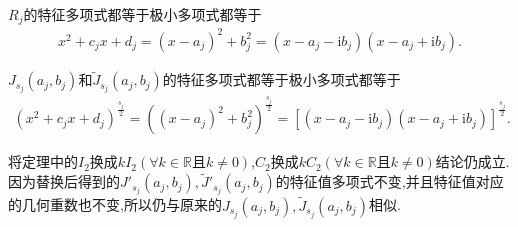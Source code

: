 \documentclass[../../main.tex]{subfiles}%
\begin{document}
\begin{theorem}[实数域上的广义Jordan标准型]
$R_j$的特征多项式都等于极小多项式都等于
\begin{align*}
x^2+c_jx+d_j=(x-a_j)^2+b_j^2=\left( x-a_j-\mathrm{i}b_j \right) \left( x-a_j+\mathrm{i}b_j \right).
\end{align*}

$J_{s_j}(a_j,b_j)$和$\widetilde{J}_{s_j}(a_j,b_j)$的特征多项式都等于极小多项式都等于
\begin{align*}
(x^2+c_jx+d_j)^{\frac{s_j}{2}}=((x-a_j)^2+b_{j}^{2})^{\frac{s_j}{2}}=\left[ \left( x-a_j-\mathrm{i}b_j \right) \left( x-a_j+\mathrm{i}b_j \right) \right] ^{\frac{s_j}{2}}.
\end{align*}
\end{theorem}
\begin{note}
将定理中的$I_2$换成$kI_2(\forall k\in \mathbb{R}\text{且}k\ne 0)$,$C_2$换成$kC_2(\forall k\in \mathbb{R}\text{且}k\ne 0)$结论仍成立.因为替换后得到的$J'_{s_j}(a_j,b_j),\widetilde{J}'_{s_j}(a_j,b_j)$的特征值多项式不变,并且特征值对应的几何重数也不变,所以仍与原来的$J_{s_j}(a_j,b_j),\widetilde{J}_{s_j}(a_j,b_j)$相似.
\end{note}
\end{document}
